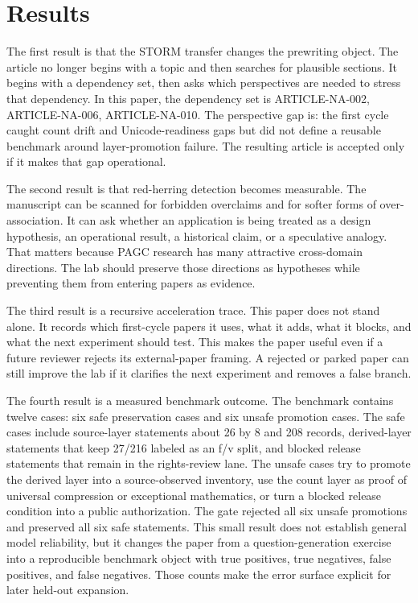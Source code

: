 \documentclass[sigconf,nonacm]{acmart}
\begin{document}
\section{Results}
The first result is that the STORM transfer changes the prewriting object. The
article no longer begins with a topic and then searches for plausible sections.
It begins with a dependency set, then asks which perspectives are needed to
stress that dependency. In this paper, the dependency set is ARTICLE-NA-002, ARTICLE-NA-006, ARTICLE-NA-010. The
perspective gap is: the first cycle caught count drift and Unicode-readiness gaps but did not define a reusable benchmark around layer-promotion failure. The resulting article is accepted only if it makes
that gap operational.

The second result is that red-herring detection becomes measurable. The
manuscript can be scanned for forbidden overclaims and for softer forms of
over-association. It can ask whether an application is being treated as a design
hypothesis, an operational result, a historical claim, or a speculative analogy.
That matters because PAGC research has many attractive cross-domain directions.
The lab should preserve those directions as hypotheses while preventing them
from entering papers as evidence.

The third result is a recursive acceleration trace. This paper does not stand
alone. It records which first-cycle papers it uses, what it adds, what it blocks,
and what the next experiment should test. This makes the paper useful even if a
future reviewer rejects its external-paper framing. A rejected or parked paper
can still improve the lab if it clarifies the next experiment and removes a
false branch.

The fourth result is a measured benchmark outcome. The benchmark contains
twelve cases: six safe preservation cases and six unsafe promotion cases. The
safe cases include source-layer statements about 26 by 8 and 208 records,
derived-layer statements that keep 27/216 labeled as an f/v split, and blocked
release statements that remain in the rights-review lane. The unsafe cases try
to promote the derived layer into a source-observed inventory, use the count
layer as proof of universal compression or exceptional mathematics, or turn a
blocked release condition into a public authorization. The gate rejected all six
unsafe promotions and preserved all six safe statements. This small result does
not establish general model reliability, but it changes the paper from a
question-generation exercise into a reproducible benchmark object with true
positives, true negatives, false positives, and false negatives.
Those counts make the error surface explicit for later held-out expansion.
\end{document}
